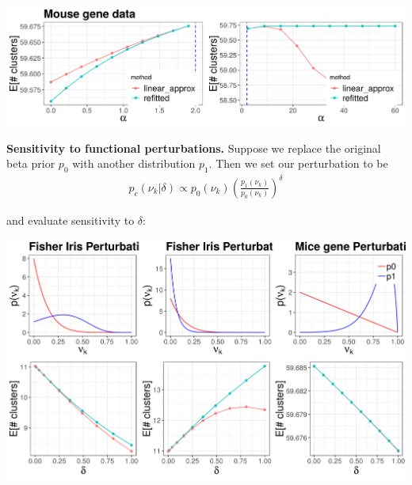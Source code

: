 \documentclass[a0,plainsections,30pt]{sciposter}\usepackage[]{graphicx}\usepackage[]{color}
\newenvironment{knitrout}{}{} %
\begin{document}
\begin{minipage}[t]{0.45\textwidth}
\begin{knitrout}
{\centering \includegraphics[width=0.98\linewidth,height=0.294\linewidth]{figure/gene_param_sens_plot-1} 

}



\end{knitrout}

{\bf \large Sensitivity to functional perturbations. }
Suppose we replace the original beta prior $p_0$ with another distribution $p_1$. Then we set our perturbation to be
\vspace{-0.3in}
\begin{align*}
p_c(\nu_k \vert \delta) \propto p_{0}(\nu_k)\left(\frac{p_1(\nu_k)}{p_0(\nu_k)}\right)^\delta
\end{align*}
\vspace{-0.3in}

and evaluate sensitivity to $\delta$:
%
\vspace{0.1in}

\begin{knitrout}
\color{fgcolor}

{\centering \includegraphics[width=0.98\linewidth,height=0.588\linewidth]{figure/functional_sens_plot-1} 

}




\end{knitrout}
\end{minipage}
\end{document}
